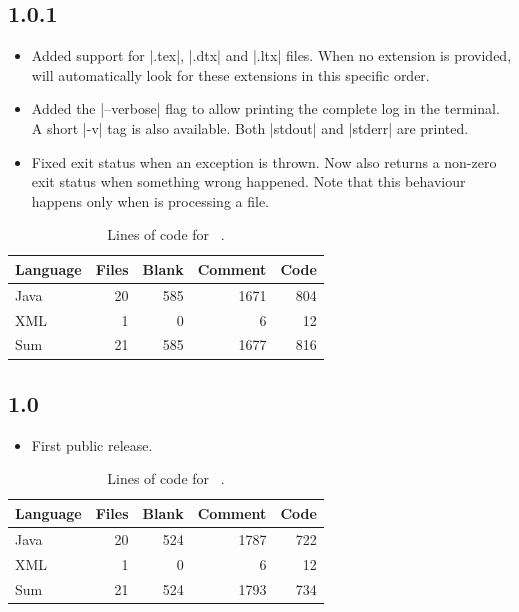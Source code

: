 \documentclass[a4paper,twoside,12pt]{memoir}
\begin{document}
\subsection*{1.0.1}

\begin{itemize}
\item[\featurenew] Added support for |.tex|, |.dtx| and |.ltx| files. When no extension is provided, \arara will automatically look for these extensions in this specific order.
\item[\featurenew] Added the |--verbose| flag to allow printing the complete log in the terminal. A short |-v| tag is also available. Both |stdout| and |stderr| are printed.
\item[\featurefixed] Fixed exit status when an exception is thrown. Now \arara also returns a non-zero exit status when something wrong happened. Note that this behaviour happens only when \arara is processing a file.
\end{itemize}

{\renewcommand{\arraystretch}{1.5}
\begin{table}[ht]
\centering
\begin{tabular}{lrrrr}
\hline
\textbf{Language} & \textbf{Files} & \textbf{Blank} & \textbf{Comment} & \textbf{Code}\\
\hline
\hline
Java & 20 & 585 & 1671 & 804\\
XML & 1 & 0 & 6 & 12\\
\hline
Sum & 21 & 585 & 1677 & 816\\
\hline
\end{tabular}
\caption{Lines of code for \arara\ .}
\label{tab:locarara101}
\end{table}}

\subsection*{1.0}

\begin{itemize}
\item[\featurenew] First public release.
\end{itemize}

{\renewcommand{\arraystretch}{1.5}
\begin{table}[ht]
\centering
\begin{tabular}{lrrrr}
\hline
\textbf{Language} & \textbf{Files} & \textbf{Blank} & \textbf{Comment} & \textbf{Code}\\
\hline
\hline
Java & 20 & 524 & 1787 & 722\\
XML & 1 & 0 & 6 & 12\\
\hline
Sum & 21 & 524 & 1793 & 734\\
\hline
\end{tabular}
\caption{Lines of code for \arara\ .}
\label{tab:locarara10}
\end{table}}
\end{document}
